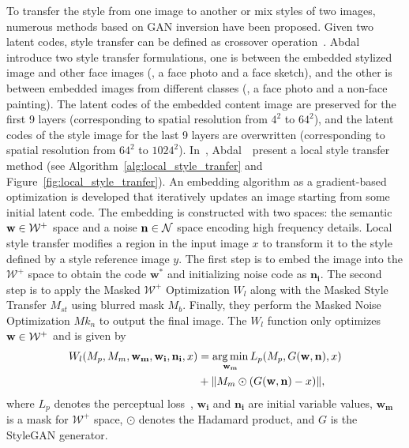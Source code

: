 To transfer the style from one image to another or mix styles of two images, numerous methods based on GAN inversion have been proposed. 
Given two latent codes, style transfer can be defined as crossover operation~\cite{karras2019style,abdal2019image2stylegan}.
Abdal~\etal~\cite{abdal2019image2stylegan} introduce two style transfer formulations, one is between the embedded stylized image and other face images (\eg, a face photo and a face sketch), and the other is between embedded images from different classes (\eg, a face photo and a non-face painting). 
The latent codes of the embedded content image are preserved for the first 9 layers (corresponding to spatial resolution from $4^{2}$ to $64^{2}$), and the latent codes of the style image for the last 9 layers are overwritten (corresponding to spatial resolution from $64^{2}$ to $1024^{2}$).
In~\cite{abdal2020image2stylegan2}, Abdal~\etal~present a local style transfer method (see Algorithm~\ref{alg:local_style_tranfer} and Figure~\ref{fig:local_style_tranfer}).
An embedding algorithm as a gradient-based optimization is developed that iteratively updates an image starting from some initial latent code. 
The embedding is constructed with two spaces: the semantic $\mathbf{w} \in \mathcal{W^{+}}$ space and a noise $\mathbf{n} \in \mathcal{N}$ space encoding high frequency details.
Local style transfer modifies a region in the input image $x$ to transform it to the style defined by a style reference image $y$. 
The first step is to embed the image into the $\mathcal{W}^{+}$ space to obtain the code $\mathbf{w^*}$ and initializing noise code as $\mathbf{n_i}$.
The second step is to apply the Masked $\mathcal{W}^{+}$ Optimization $W_{l}$ along with the Masked Style Transfer $M_{st}$ using blurred mask $M_b$. 
Finally, they perform the Masked Noise Optimization $M k_{n}$ to output the final image. 
The $W_{l}$ function only optimizes $\mathbf{w} \in \mathcal{W}^{+}$ and is given by
\begin{equation}
\begin{aligned}
W_l(M_p, M_m, \mathbf{w_m}, \mathbf{w_i}, \mathbf{n_i},x) & = \underset{\mathbf{w_m}}{\arg\min}\, L_p(M_{p}, G(\w, \n), x) \\
& + \|M_{m} \odot (G(\w, \n) - x)\|,
\end{aligned}
\label{eqn:ml}
\end{equation}
where $L_p$ denotes the perceptual loss~\cite{johnson2016perceptual},
$\mathbf{w_i}$ and $\mathbf{n_i}$ are initial variable values, 
$\mathbf{w_m}$ is a mask for $\mathcal{W}^{+}$ space, $\odot$ denotes the Hadamard product, and $G$ is the StyleGAN generator.
